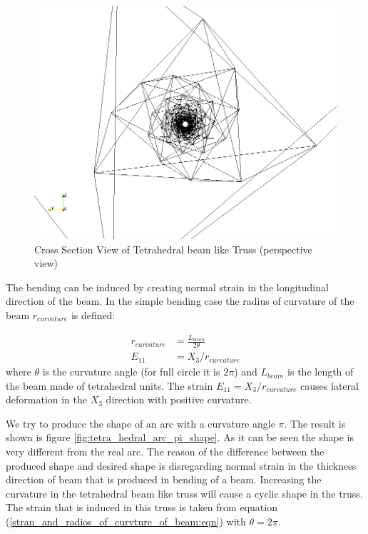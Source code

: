 \begin{figure} 
\centering
\includegraphics[width=5.0in]{./chap_5_active_trusses//images_linear_tetrahedral/refrence_shap_100_tetra_unit_tetrahedral_unit_cross_section_view.png}
\caption{Cross Section View of Tetrahedral beam like Truss (perspective view)}
\label{fig:refrence_shap_100_tetra_unit_tetrahedral_unit_cross_section_view}
\end{figure} 

The bending can be induced by creating normal strain in the longitudinal direction of the beam.
In the simple bending case the radius of curvature of the beam $r_{curvature}$ is defined:

\begin{equation}
\begin{aligned}
r_{curvature}&=\frac{ L_{beam} }{2 \theta}\\
E_{11}&=X_3/r_{curvature}
\end{aligned}
\label{stran_and_radios_of_curvture_of_beam:eqn}
\end{equation}
where 
$\theta$ is the curvature angle (for full circle it is $2\pi$) and
$ L_{beam}$ is the length of the beam made of tetrahedral units.
The strain $E_{11}=X_3/r_{curvature}$ causes lateral deformation in the $X_3$ direction with positive curvature.

We try to produce the shape of an arc with a curvature angle $\pi$.
The result is shown is figure \ref{fig:tetra_hedral_arc_pi_shape}.
As it can be seen the shape is very different from the real arc.
The reason of the difference between the produced shape and desired shape is disregarding normal strain in the thickness direction of beam that is produced in bending of a beam.
Increasing the curvature in the tetrahedral beam like truss will cause a cyclic shape in the truss.
The strain that is induced in this truss is taken from equation (\ref{stran_and_radios_of_curvture_of_beam:eqn}) with $\theta=2 \pi$.

